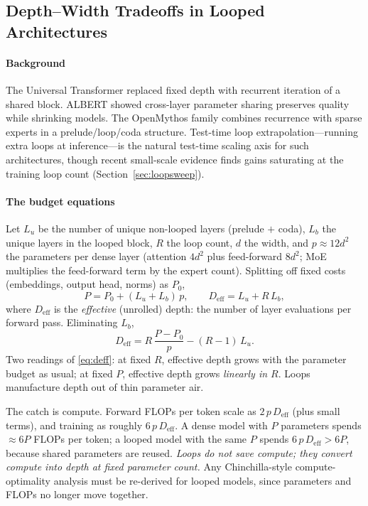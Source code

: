 \subsection{Depth--Width Tradeoffs in Looped Architectures}
\label{ch-depthwidth}

\paragraph{Background}

The Universal Transformer \citep{dehghani2019universal} replaced
fixed depth with recurrent iteration of a shared block. ALBERT
\citep{lan2020albert} showed cross-layer parameter sharing
preserves quality while shrinking models. The OpenMythos family
\citep{gomez2024openmythos} combines recurrence with sparse
experts in a prelude/loop/coda structure. Test-time loop
extrapolation---running extra loops at inference---is the natural
test-time scaling axis for such architectures, though
recent small-scale evidence finds gains saturating at the
training loop count (Section~\ref{sec:loopsweep}).

\paragraph{The budget equations}
\label{sec:budget}

Let $L_u$ be the number of unique non-looped layers (prelude $+$
coda), $L_b$ the unique layers in the looped block, $R$ the loop
count, $d$ the width, and $p \approx 12d^2$ the parameters per
dense layer (attention $4d^2$ plus feed-forward $8d^2$; MoE
multiplies the feed-forward term by the expert count). Splitting
off fixed costs (embeddings, output head, norms) as $P_0$,
\begin{equation}
  P = P_0 + (L_u + L_b)\,p, \qquad
  D_{\mathrm{eff}} = L_u + R\,L_b,
  \label{eq:budget}
\end{equation}
where $D_{\mathrm{eff}}$ is the \emph{effective} (unrolled) depth:
the number of layer evaluations per forward pass. Eliminating
$L_b$,
\begin{equation}
  D_{\mathrm{eff}} = R\,\frac{P - P_0}{p} - (R - 1)\,L_u .
  \label{eq:deff}
\end{equation}
Two readings of \eqref{eq:deff}: at fixed $R$, effective depth
grows with the parameter budget as usual; at fixed $P$,
effective depth grows \emph{linearly in $R$}. Loops manufacture
depth out of thin parameter air.

The catch is compute. Forward FLOPs per token scale as
$2\,p\,D_{\mathrm{eff}}$ (plus small terms), and training as
roughly $6\,p\,D_{\mathrm{eff}}$. A dense model with $P$
parameters spends $\approx 6P$ FLOPs per token; a looped model
with the same $P$ spends $6\,p\,D_{\mathrm{eff}} > 6P$, because
shared parameters are reused. \emph{Loops do not save compute;
they convert compute into depth at fixed parameter count.} Any
Chinchilla-style compute-optimality analysis must be re-derived
for looped models, since parameters and FLOPs no longer move
together.


